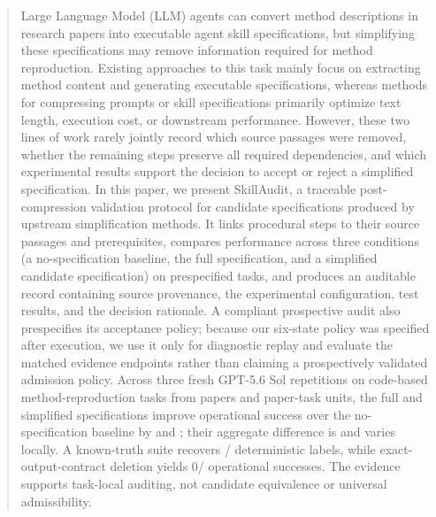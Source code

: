 \begin{abstract}
\label{abs}

Large Language Model (LLM) agents can convert method descriptions in research papers into executable agent skill specifications, but simplifying these specifications may remove information required for method reproduction. Existing approaches to this task mainly focus on extracting method content and generating executable specifications, whereas methods for compressing prompts or skill specifications primarily optimize text length, execution cost, or downstream performance.
However, these two lines of work rarely jointly record which source passages were removed, whether the remaining steps preserve all required dependencies, and which experimental results support the decision to accept or reject a simplified specification. 
In this paper, we present SkillAudit, a traceable post-compression validation protocol for candidate specifications produced by upstream simplification methods. 
It links procedural steps to their source passages and prerequisites, compares performance across three conditions (a no-specification baseline, the full specification, and a simplified candidate specification) on prespecified tasks, and produces an auditable record containing source provenance, the experimental configuration, test results, and the decision rationale. A compliant prospective audit also prespecifies its acceptance policy; because our six-state policy was specified after execution, we use it only for diagnostic replay and evaluate the matched evidence endpoints rather than claiming a prospectively validated admission policy.
Across three fresh GPT-5.6 Sol repetitions on code-based method-reproduction tasks from \PrimaryPapers{} papers and \PrimaryTasks{} paper-task units, the full and simplified specifications improve operational success over the no-specification baseline by \FBSuccessEffect{} and \SBSuccessEffect{}; their aggregate difference is \SFSuccessEffect{} and varies locally. A known-truth suite recovers \ControlDeterministicCorrect{}/\ControlDeterministicCells{} deterministic labels, while exact-output-contract deletion yields 0/\ControlRowsPerArm{} operational successes. The evidence supports task-local auditing, not candidate equivalence or universal admissibility.

\end{abstract}
